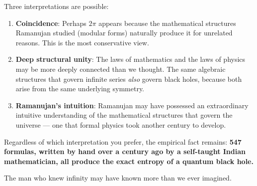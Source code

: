 \documentclass[11pt,a4paper]{article}
\begin{document}
Three interpretations are possible:

\begin{enumerate}[leftmargin=2em]
    \item \textbf{Coincidence}: Perhaps $2\pi$ appears because the mathematical structures Ramanujan studied (modular forms) naturally produce it for unrelated reasons. This is the most conservative view.
    
    \item \textbf{Deep structural unity}: The laws of mathematics and the laws of physics may be more deeply connected than we thought. The same algebraic structures that govern infinite series \textit{also} govern black holes, because both arise from the same underlying symmetry.
    
    \item \textbf{Ramanujan's intuition}: Ramanujan may have possessed an extraordinary intuitive understanding of the mathematical structures that govern the universe — one that formal physics took another century to develop.
\end{enumerate}

Regardless of which interpretation you prefer, the empirical fact remains: \textbf{547 formulas, written by hand over a century ago by a self-taught Indian mathematician, all produce the exact entropy of a quantum black hole.}

The man who knew infinity may have known more than we ever imagined.

\end{document}
